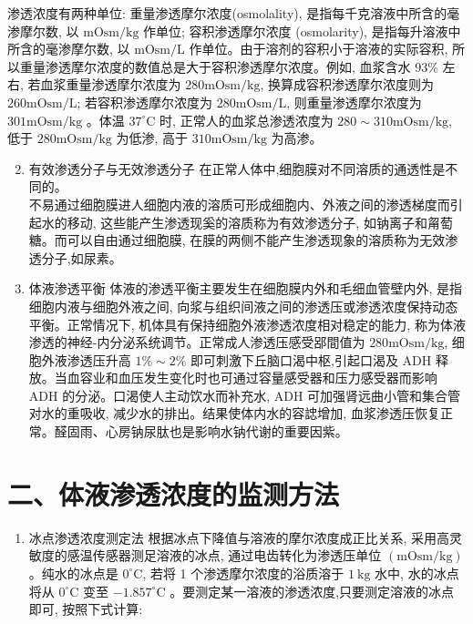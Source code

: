 \documentclass[10pt]{article}
\begin{document}
渗透浓度有两种单位: 重量渗透摩尔浓度(osmolality), 是指每千克溶液中所含的毫渗摩尔数, 以 $\mathrm{mOsm} / \mathrm{kg}$ 作单位; 容积渗透摩尔浓度 (osmolarity), 是指每升溶液中所含的毫渗摩尔数, 以 $\mathrm{mOsm} / \mathrm{L}$ 作单位。由于溶剂的容积小于溶液的实际容积, 所以重量渗透摩尔浓度的数值总是大于容积渗透摩尔浓度。例如, 血浆含水 $93 \%$ 左右, 若血浆重量渗透摩尔浓度为 $280 \mathrm{mOsm} / \mathrm{kg}$, 换算成容积渗透摩尔浓度则为 $260 \mathrm{mOsm} / \mathrm{L}$; 若容积渗透摩尔浓度为 $280 \mathrm{mOsm} / \mathrm{L}$, 则重量渗透摩尔浓度为 $301 \mathrm{mOsm} / \mathrm{kg}$ 。体温 $37^{\circ} \mathrm{C}$ 时, 正常人的血浆总渗透浓度为 $280 \sim 310 \mathrm{mOsm} / \mathrm{kg}$, 低于 $280 \mathrm{mOsm} / \mathrm{kg}$ 为低渗, 高于 $310 \mathrm{mOsm} / \mathrm{kg}$ 为高渗。

\begin{enumerate}
  \setcounter{enumi}{1}
  \item 有效渗透分子与无效渗透分子 在正常人体中,细胞膜对不同溶质的通透性是不同的。\\
不易通过细胞膜进人细胞内液的溶质可形成细胞内、外液之间的渗透梯度而引起水的移动, 这些能产生渗透现奚的溶质称为有效渗透分子, 如钠离子和甮萄糖。而可以自由通过细胞膜, 在膜的两侧不能产生渗透现象的溶质称为无效渗透分子,如尿素。

  \item 体液渗透平衡 体液的渗透平衡主要发生在细胞膜内外和毛细血管壁内外, 是指细胞内液与细胞外液之间, 向浆与组织间液之间的渗透压或渗透浓度保持动态平衡。正常情况下, 机体具有保持细胞外液渗透浓度相对稳定的能力, 称为体液渗透的神经-内分泌系统调节。正常成人渗透压感受郘間值为 $280 \mathrm{mOsm} / \mathrm{kg}$, 细胞外液渗透压升高 $1 \% \sim 2 \%$ 即可刺激下丘脑口渴中枢,引起口渴及 ADH 释放。当血容业和血压发生变化时也可通过容量感受器和压力感受器而影响 $\mathrm{ADH}$ 的分泌。口渴使人主动饮水而补充水, ADH 可加强肾远曲小管和集合管对水的重吸收, 减少水的排出。结果使体内水的容䛱增加, 血浆渗透压恢复正常。醛固雨、心房钠尿肽也是影响水钠代谢的重要因紫。

\end{enumerate}

\section*{二、体液渗透浓度的监测方法}
\begin{enumerate}
  \item 冰点渗透浓度测定法 根据冰点下降值与溶液的摩尔浓度成正比关系, 采用高灵敏度的感温传感器测足溶液的冰点, 通过电齿转化为渗透压单位 $(\mathrm{mOsm} / \mathrm{kg})$ 。纯水的冰点是 $0^{\circ} \mathrm{C}$, 若将 1 个渗透摩尔浓度的浴质溶于 $1 \mathrm{~kg}$ 水中, 水的冰点将从 $0^{\circ} \mathrm{C}$ 变至 $-1.857^{\circ} \mathrm{C}$ 。要测定某一溶液的渗透浓度,只要测定溶液的冰点即可, 按照下式计算:
\end{enumerate}
\end{document}
